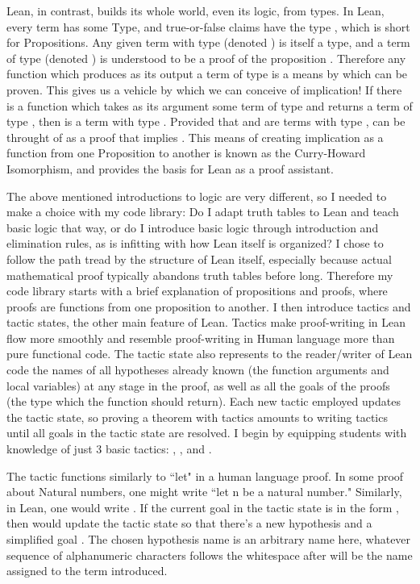 Lean, in contrast, builds its whole world, even its logic, from types. 
In Lean, every term has some Type, and true-or-false claims have the type 
, which is short for Propositions. Any given term  with
type  (denoted ) is itself a type, and a term 
 of type  (denoted ) is understood to be a 
proof of the proposition . Therefore any function which produces as its
output a term of type  is a means by which  can be proven. This gives 
us a vehicle by which we can conceive of implication! If there is a function
 which takes as its argument some term  of type  and returns
a term of type , then  is a term with type . Provided that 
 and  are terms with type ,  can be throught of as a proof
that  implies . This means of creating implication as a function from
one Proposition to another is known as the Curry-Howard Isomorphism, and
provides the basis for Lean as a proof assistant. 

The above mentioned introductions to logic are very different, so I needed
to make a choice with my code library: Do I adapt truth tables to
Lean and teach basic logic that way, or do I introduce basic logic through
introduction and elimination rules, as is infitting with how Lean itself 
is organized? I chose to follow the path tread by the structure of Lean itself,
especially because actual mathematical proof typically abandons truth tables
before long. Therefore my code library starts with a brief explanation of
propositions and proofs, where proofs are functions from one proposition to
another. I then introduce tactics and tactic states, the other main feature
of Lean. Tactics make proof-writing in Lean flow more smoothly and resemble 
proof-writing in Human language more than pure functional code. The tactic
state also represents to the reader/writer of Lean code the names of all
hypotheses already known (the function arguments and local variables) at any stage in the proof, as 
well as all the goals of the proofs (the type which the function should return).
Each new tactic employed updates the tactic state, so proving a theorem with
tactics amounts to writing tactics until all goals in the tactic state are resolved. 
I begin by equipping students with knowledge of 
just 3 basic tactics: , , and .

The  tactic functions similarly to ``let" in a human language proof. 
In some proof about Natural numbers, one might write ``let n be a natural number."
Similarly, in Lean, one would write .
If the current goal in the tactic state is in the form , then
 would update the tactic state so that there's a new hypothesis
 and a simplified goal . The chosen hypothesis name  is an arbitrary name here, whatever
sequence of alphanumeric characters follows the whitespace after  will
be the name assigned to the term introduced. 

